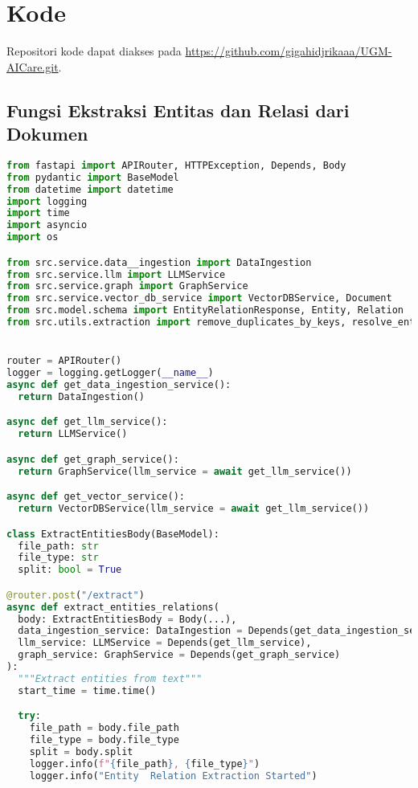 \vspace{15cm}
\section{Kode}
Repositori kode dapat diakses pada \href{https://github.com/gigahidjrikaaa/UGM-AICare.git}{https://github.com/gigahidjrikaaa/UGM-AICare.git}.
\subsection{Fungsi Ekstraksi Entitas dan Relasi dari Dokumen}
\begin{lstlisting}[numbers=none, language=python]
from fastapi import APIRouter, HTTPException, Depends, Body
from pydantic import BaseModel
from datetime import datetime
import logging
import time
import asyncio
import os

from src.service.data__ingestion import DataIngestion
from src.service.llm import LLMService
from src.service.graph import GraphService
from src.service.vector_db_service import VectorDBService, Document
from src.model.schema import EntityRelationResponse, Entity, Relation
from src.utils.extraction import remove_duplicates_by_keys, resolve_entities_with_merged_descriptions, remap_relations


router = APIRouter()
logger = logging.getLogger(__name__)
async def get_data_ingestion_service():
  return DataIngestion()

async def get_llm_service():
  return LLMService()

async def get_graph_service():
  return GraphService(llm_service = await get_llm_service())

async def get_vector_service():
  return VectorDBService(llm_service = await get_llm_service())

class ExtractEntitiesBody(BaseModel):
  file_path: str
  file_type: str
  split: bool = True

@router.post("/extract")
async def extract_entities_relations(
  body: ExtractEntitiesBody = Body(...),
  data_ingestion_service: DataIngestion = Depends(get_data_ingestion_service),
  llm_service: LLMService = Depends(get_llm_service),
  graph_service: GraphService = Depends(get_graph_service)
):
  """Extract entities from text"""
  start_time = time.time()

  try:
    file_path = body.file_path
    file_type = body.file_type
    split = body.split
    logger.info(f"{file_path}, {file_type}")
    logger.info("Entity  Relation Extraction Started")


\end{lstlisting}
